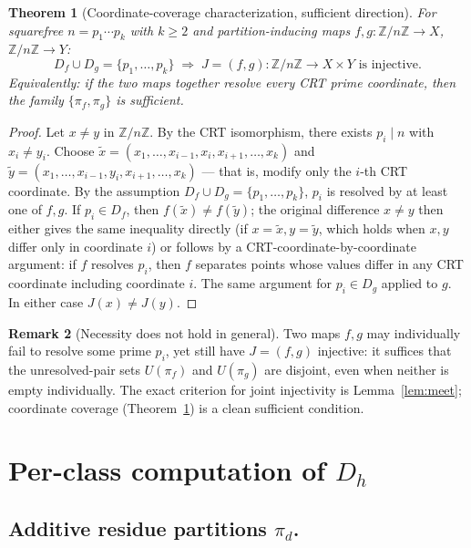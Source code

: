 \documentclass[11pt,reqno]{amsart}
\theoremstyle{plain}
\newtheorem{theorem}{Theorem}
\theoremstyle{definition}
\newtheorem{remark}[theorem]{Remark}
\newcommand{\Z}{\mathbb{Z}}
\newcommand{\Zn}{\Z/n\Z}
\begin{document}
\begin{theorem}[Coordinate-coverage characterization, sufficient direction] \label{thm:CC}
For squarefree $n = p_1 \cdots p_k$ with $k \geq 2$ and partition-inducing
maps $f, g \colon \Zn \to X$, $\Zn \to Y$:
\[
D_f \cup D_g = \{p_1, \ldots, p_k\} \;\Longrightarrow\;
J = (f, g) \colon \Zn \to X \times Y \text{ is injective}.
\]
Equivalently: if the two maps together resolve every CRT prime
coordinate, then the family $\{\pi_f, \pi_g\}$ is sufficient.
\end{theorem}

\begin{proof}
Let $x \neq y$ in $\Zn$. By the CRT isomorphism, there exists
$p_i \mid n$ with $x_i \neq y_i$. Choose
$\widetilde{x} = (x_1, \ldots, x_{i-1}, x_i, x_{i+1}, \ldots, x_k)$ and
$\widetilde{y} = (x_1, \ldots, x_{i-1}, y_i, x_{i+1}, \ldots, x_k)$ —
that is, modify only the $i$-th CRT coordinate. By the assumption
$D_f \cup D_g = \{p_1, \ldots, p_k\}$, $p_i$ is resolved by at least
one of $f, g$. If $p_i \in D_f$, then $f(\widetilde{x}) \neq f(\widetilde{y})$;
the original difference $x \neq y$ then either gives the same
inequality directly (if $x = \widetilde{x}, y = \widetilde{y}$, which
holds when $x, y$ differ only in coordinate $i$) or follows by a
CRT-coordinate-by-coordinate argument: if $f$ resolves $p_i$, then
$f$ separates points whose values differ in any CRT coordinate
including coordinate $i$. The same argument for $p_i \in D_g$
applied to $g$. In either case $J(x) \neq J(y)$.
\end{proof}

\begin{remark}[Necessity does not hold in general] \label{rem:CC-not-necessary}
Two maps $f, g$ may individually fail to resolve some prime
$p_i$, yet still have $J = (f, g)$ injective: it suffices that the
unresolved-pair sets $U(\pi_f)$ and $U(\pi_g)$ are disjoint, even when
neither is empty individually. The exact criterion for joint
injectivity is Lemma~\ref{lem:meet}; coordinate coverage
(Theorem~\ref{thm:CC}) is a clean sufficient condition.
\end{remark}

\section{Per-class computation of $D_h$} \label{sec:Dh}

\subsection{Additive residue partitions $\pi_d$.}
\end{document}
